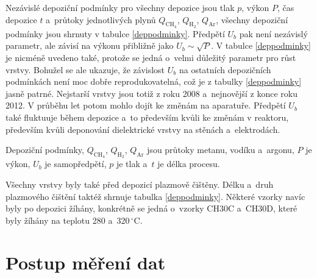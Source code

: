 Nezávislé depoziční podmínky pro všechny depozice jsou tlak $p$, výkon $P$, čas depozice $t$ a~průtoky jednotlivých plynů $Q_{\mathrm{CH_4}}$, $Q_{\mathrm{H_2}}$, $Q_{\mathrm{Ar}}$, všechny depoziční podmínky jsou shrnuty v tabulce \ref{deppodminky}. Předpětí $U_b$ pak není nezávislý parametr, ale závisí na výkonu přibližně jako $U_b \sim \sqrt{P}$.
V tabulce \ref{deppodminky} je nicméně uvedeno také, protože se jedná o~velmi důležitý parametr pro růst vrstvy. Bohužel se ale ukazuje, že závislost $U_b$ na ostatních depozičních podmínkách není moc dobře reprodukovatelná, což je z tabulky \ref{deppodminky} jasně patrné. Nejstarší vrstvy jsou totiž z roku 2008 a~nejnovější z konce roku 2012. V průběhu let potom mohlo dojít ke změnám na aparatuře. Předpětí $U_b$ také fluktuuje během depozice a~to především kvůli ke změnám v reaktoru, především kvůli deponování dielektrické vrstvy na stěnách a~elektrodách. 

\begin{table}[tb]
 \centering
 \renewcommand{\tabcolsep}{1pt}
 
 \caption{Depoziční podmínky, $Q_{\mathrm{CH_4}}$, $Q_{\mathrm{H_2}}$, $Q_{\mathrm{Ar}}$ jsou průtoky metanu, vodíku a~argonu, $P$ je výkon, $U_b$ je samopředpětí, $p$ je tlak a~$t$ je délka procesu.}
\label{deppodminky}
\end{table}

Všechny vrstvy byly také před depozicí plazmově čištěny. Délku a~druh plazmového čištění taktéž shrnuje tabulka \ref{deppodminky}. Některé vzorky navíc byly po depozici žíhány, konkrétně se jedná o~vzorky CH30C a~CH30D, které byly žíhány na teplotu 280 a~320\,$^\circ$C.

\section{Postup měření dat}

